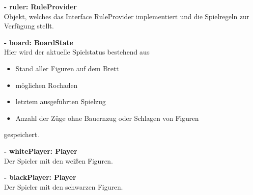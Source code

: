 \documentclass[parskip=full]{scrartcl}
\begin{document}
				\begin{description}
					 \item \textbf{- ruler: RuleProvider}\\ Objekt, welches das Interface RuleProvider implementiert und die Spielregeln zur Verfügung stellt.
					 \item \textbf{- board: BoardState}\\ Hier wird der aktuelle Spielstatus bestehend aus
					 \begin{itemize}
					 
			\item Stand aller Figuren auf dem Brett
			\item möglichen Rochaden
			\item letztem ausgeführten Spielzug
			\item Anzahl der Züge ohne Bauernzug oder Schlagen von Figuren
			  \end{itemize}	
			  	 gespeichert.
					 \item \textbf{- whitePlayer: Player}\\ Der Spieler mit den weißen Figuren.
					 \item \textbf{- blackPlayer: Player}\\ Der Spieler mit den schwarzen Figuren.\\
			    \\
				\end{description} 
				
\end{document}
